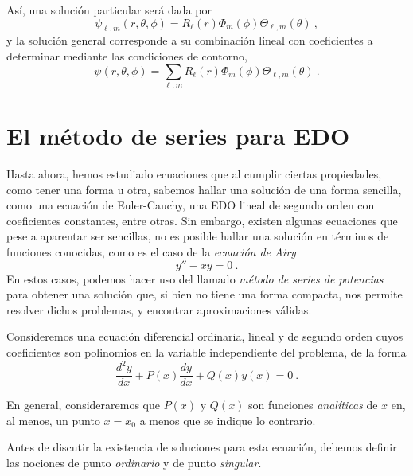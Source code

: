 Así, una solución particular será dada por
\begin{equation}
    \psi_{\ell, m}(r, \theta, \phi) = R_\ell(r) \Phi_m(\phi) \Theta_{\ell, m}(\theta) \ ,
\end{equation}
y la solución general corresponde a su combinación lineal con coeficientes a determinar mediante las condiciones de contorno,
\begin{equation}
    \psi(r, \theta, \phi) = \sum_{\ell, m} R_\ell(r) \Phi_m(\phi) \Theta_{\ell, m}(\theta) \ .
\end{equation}

\section{El método de series para EDO}

Hasta ahora, hemos estudiado ecuaciones que al cumplir ciertas propiedades, como tener una forma u otra, sabemos hallar una solución de una forma sencilla, como una ecuación de Euler-Cauchy, una EDO lineal de segundo orden con coeficientes constantes, entre otras. Sin embargo, existen algunas ecuaciones que pese a aparentar ser sencillas, no es posible hallar una solución en términos de funciones conocidas, como es el caso de la \emph{ecuación de Airy}
\begin{equation}
    y'' - xy = 0 \ .
\end{equation}
En estos casos, podemos hacer uso del llamado \emph{método de series de potencias} para obtener una solución que, si bien no tiene una forma compacta, nos permite resolver dichos problemas, y encontrar aproximaciones válidas.


Consideremos una ecuación diferencial ordinaria, lineal y de segundo orden cuyos coeficientes son polinomios en la variable independiente del problema, de la forma
\begin{equation} \label{eq:EDO_Series}
    \frac{d^2 y}{dx} + P(x) \frac{dy}{dx} + Q(x) y(x) = 0 \ .
\end{equation}

En general, consideraremos que $P(x)$ y $Q(x)$ son funciones \emph{analíticas} de $x$ en, al menos, un punto $x=x_0$ a menos que se indique lo contrario.

Antes de discutir la existencia de soluciones para esta ecuación, debemos definir las nociones de punto \emph{ordinario} y de punto \emph{singular}.

